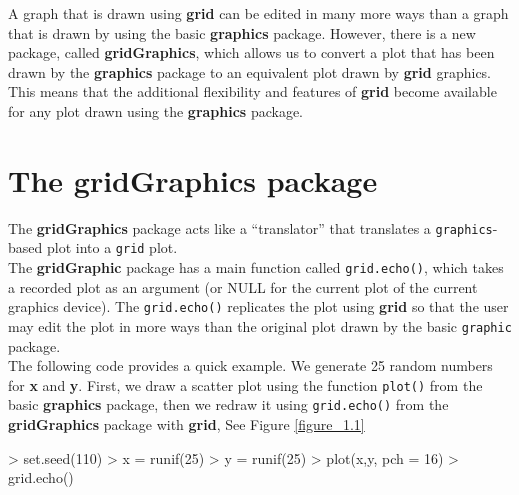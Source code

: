 \documentclass[11pt,twoside]{report}
\begin{document}
A graph that is drawn using \textbf{grid} can be edited in many more ways than a graph that is drawn by using the basic \textbf{graphics} package. However, there is a new package, called \textbf{gridGraphics}, which allows us to convert a plot that has been drawn by the \textbf{graphics} package to an equivalent plot drawn by \textbf{grid} graphics. This means that the additional flexibility and features of \textbf{grid} become available for any plot drawn using the \textbf{graphics} package. \\

\section{The \textbf{gridGraphics} package}
The \textbf{gridGraphics} \citep{gGpackage} package acts like a ``translator'' that translates a \texttt{graphics}-based plot into a \texttt{grid} plot.\\

The \textbf{gridGraphic} package has a main function called \texttt{grid.echo()}, which takes a recorded plot as an argument (or NULL for the current plot of the current graphics device). The \texttt{grid.echo()} replicates the plot using \textbf{grid} so that the user may edit the plot in more ways than the original plot drawn by the basic \texttt{graphic} package.\\

The following code provides a quick example. We generate 25 random numbers for \textbf{x} and \textbf{y}. First, we draw a scatter plot using the function \texttt{plot()} from the basic \textbf{graphics} package, then we redraw it using \texttt{grid.echo()} from the \textbf{gridGraphics} package with \textbf{grid}, See Figure \ref{figure_1.1}
\begin{Schunk}
\begin{Sinput}
> set.seed(110)
> x = runif(25)
> y = runif(25)
> plot(x,y, pch = 16)
> grid.echo()
\end{Sinput}
\end{Schunk}
\end{document}
